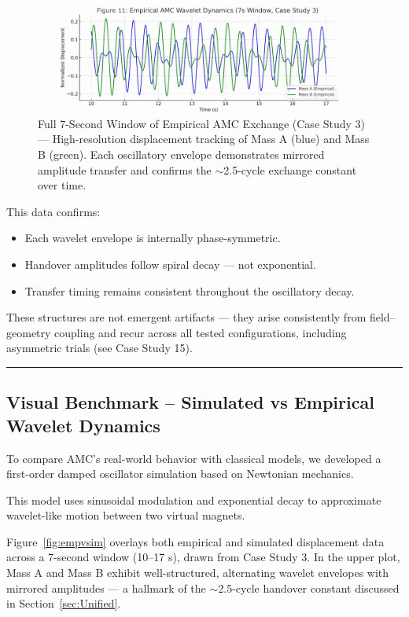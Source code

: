 \documentclass[10pt,aps,pre,onecolumn,superscriptaddress,notitlepage]{revtex4-2}
\begin{document}
\begin{figure}[htbp]
  \centering
  \includegraphics[width=0.8\linewidth]{figures/Figure_5I_CaseStudy3_Empirical_Only.jpg}
  \caption{Full 7-Second Window of Empirical AMC Exchange (Case Study 3) — High-resolution displacement tracking of Mass A (blue) and Mass B (green). Each oscillatory envelope demonstrates mirrored amplitude transfer and confirms the $\sim$2.5-cycle exchange constant over time.}
  \label{fig:fullcycle}
\end{figure}
This data confirms:

\begin{itemize}
    \item Each wavelet envelope is internally phase-symmetric.
    
    \item Handover amplitudes follow spiral decay — not exponential.
    \item Transfer timing remains consistent throughout the oscillatory decay.
\end{itemize}
These structures are not emergent artifacts — they arise consistently from field–geometry coupling and recur across all tested configurations, including asymmetric trials (see Case Study 15). 
\vspace{1em}
\hrule
\vspace{1em}
\clearpage
\subsection{Visual Benchmark – Simulated vs Empirical Wavelet Dynamics}
\label{sec:VisualBenchmark}
To compare AMC’s real-world behavior with classical models, we developed a first-order damped oscillator simulation based on Newtonian mechanics. 

This model uses sinusoidal modulation and exponential decay to approximate wavelet-like motion between two virtual magnets.

Figure~\ref{fig:empvsim} overlays both empirical and simulated displacement data across a 7-second window (10–17 s), drawn from Case Study 3. In the upper plot, Mass A and Mass B exhibit well-structured, alternating wavelet envelopes with mirrored amplitudes — a hallmark of the $\sim$2.5-cycle handover constant discussed in Section~\ref{sec:Unified}.
\end{document}
